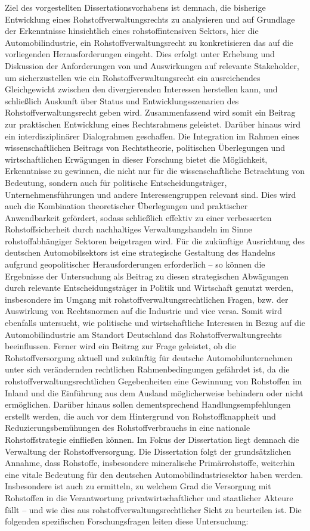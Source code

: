 \documentclass[12pt,a4paper,oneside]{book} %
\begin{document}
Ziel des vorgestellten Dissertationsvorhabens ist demnach, die bisherige Entwicklung eines Rohstoffverwaltungsrechts zu analysieren und auf Grundlage der Erkenntnisse hinsichtlich eines rohstoffintensiven Sektors, hier die Automobilindustrie, ein Rohstoffverwaltungsrecht zu konkretisieren das auf die vorliegenden Herausforderungen eingeht. Dies erfolgt unter Erhebung und Diskussion der Anforderungen von und Auswirkungen auf relevante Stakeholder, um sicherzustellen wie ein Rohstoffverwaltungsrecht ein ausreichendes Gleichgewicht zwischen den divergierenden Interessen herstellen kann, und schließlich Auskunft über Status und Entwicklungsszenarien des Rohstoffverwaltungsrecht geben wird. Zusammenfassend wird somit ein Beitrag zur praktischen Entwicklung eines Rechtsrahmens geleistet. Darüber hinaus wird ein interdisziplinärer Dialograhmen geschaffen. Die Integration im Rahmen eines wissenschaftlichen Beitrags von Rechtstheorie, politischen Überlegungen und wirtschaftlichen Erwägungen in dieser Forschung bietet die Möglichkeit, Erkenntnisse zu gewinnen, die nicht nur für die wissenschaftliche Betrachtung von Bedeutung, sondern auch für politische Entscheidungsträger, Unternehmensführungen und andere Interessengruppen relevant sind. Dies wird auch die Kombination theoretischer Überlegungen und praktischer Anwendbarkeit gefördert, sodass schließlich effektiv zu einer verbesserten Rohstoffsicherheit durch nachhaltiges Verwaltungshandeln im Sinne rohstoffabhängiger Sektoren beigetragen wird.
Für die zukünftige Ausrichtung des deutschen Automobilsektors ist eine strategische Gestaltung des Handelns aufgrund geopolitischer Herausforderungen erforderlich – so können die Ergebnisse der Untersuchung als Beitrag zu diesen strategischen Abwägungen durch relevante Entscheidungsträger in Politik und Wirtschaft genutzt werden, insbesondere im Umgang mit rohstoffverwaltungsrechtlichen Fragen, bzw. der Auswirkung von Rechtsnormen auf die Industrie und vice versa. Somit wird ebenfalls untersucht, wie politische und wirtschaftliche Interessen in Bezug auf die Automobilindustrie am Standort Deutschland das Rohstoffverwaltungrechts beeinflussen.
Ferner wird ein Beitrag zur Frage geleistet, ob die Rohstoffversorgung aktuell und zukünftig für deutsche Automobilunternehmen unter sich verändernden rechtlichen Rahmenbedingungen gefährdet ist, da die rohstoffverwaltungsrechtlichen Gegebenheiten eine Gewinnung von Rohstoffen im Inland und die Einführung aus dem Ausland möglicherweise behindern oder nicht ermöglichen. Darüber hinaus sollen dementsprechend Handlungsempfehlungen erstellt werden, die auch vor dem Hintergrund von Rohstoffknappheit und Reduzierungsbemühungen des Rohstoffverbrauchs in eine nationale Rohstoffstrategie einfließen können. Im Fokus der Dissertation liegt demnach die Verwaltung der Rohstoffversorgung. Die Dissertation folgt der grundsätzlichen Annahme, dass Rohstoffe, insbesondere mineralische Primärrohstoffe, weiterhin eine vitale Bedeutung für den deutschen Automobilindustriesektor haben werden. Insbesondere ist auch zu ermitteln, zu welchem Grad die Versorgung mit Rohstoffen in die Verantwortung privatwirtschaftlicher und staatlicher Akteure fällt – und wie dies aus rohstoffverwaltungsrechtlicher Sicht zu beurteilen ist.
Die folgenden spezifischen Forschungsfragen leiten diese Untersuchung:
\end{document}
